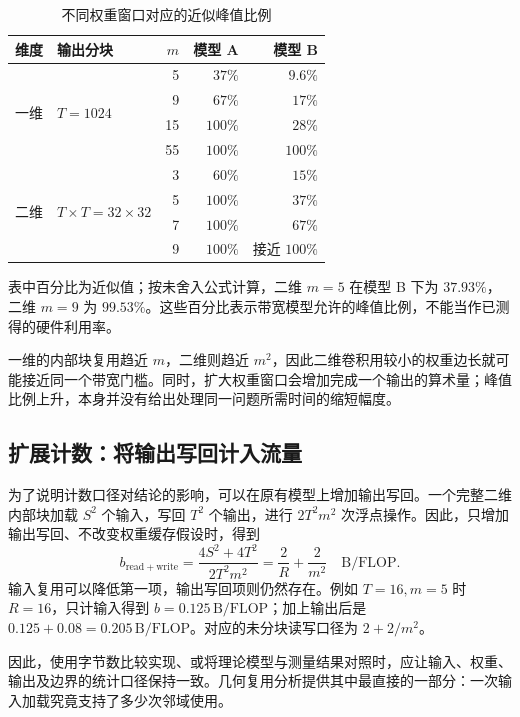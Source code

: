 \begin{table}[htbp]
\centering\small
\caption{不同权重窗口对应的近似峰值比例}
\label{l9:tab:mask-balance}
\begin{tabular}{@{}llrrr@{}}\toprule
维度 & 输出分块 & $m$ & 模型 A & 模型 B\\\midrule
\multirow{4}{*}{一维} & \multirow{4}{*}{$T=1024$} & 5 & $37\%$ & $9.6\%$\\
 & & 9 & $67\%$ & $17\%$\\
 & & 15 & $100\%$ & $28\%$\\
 & & 55 & $100\%$ & $100\%$\\\midrule
\multirow{4}{*}{二维} & \multirow{4}{*}{$T\times T=32\times32$} & 3 & $60\%$ & $15\%$\\
 & & 5 & $100\%$ & $37\%$\\
 & & 7 & $100\%$ & $67\%$\\
 & & 9 & $100\%$ & 接近 $100\%$\\\bottomrule
\end{tabular}
\end{table}

表中百分比为近似值；按未舍入公式计算，二维 $m=5$ 在模型 B 下为 $37.93\%$，二维 $m=9$ 为 $99.53\%$。这些百分比表示带宽模型允许的峰值比例，不能当作已测得的硬件利用率。

一维的内部块复用趋近 $m$，二维则趋近 $m^2$，因此二维卷积用较小的权重边长就可能接近同一个带宽门槛。同时，扩大权重窗口会增加完成一个输出的算术量；峰值比例上升，本身并没有给出处理同一问题所需时间的缩短幅度。

\subsection{扩展计数：将输出写回计入流量}
为了说明计数口径对结论的影响，可以在原有模型上增加输出写回。一个完整二维内部块加载 $S^2$ 个输入，写回 $T^2$ 个输出，进行 $2T^2m^2$ 次浮点操作。因此，只增加输出写回、不改变权重缓存假设时，得到
\begin{equation}
 b_{\mathrm{read+write}}
 =\frac{4S^2+4T^2}{2T^2m^2}
 =\frac{2}{R}+\frac{2}{m^2}\quad\mathrm{B}/\mathrm{FLOP}.
 \label{l9:eq:include-output}
\end{equation}
输入复用可以降低第一项，输出写回项则仍然存在。例如 $T=16,m=5$ 时 $R=16$，只计输入得到 $b=0.125\,\mathrm{B}/\mathrm{FLOP}$；加上输出后是 $0.125+0.08=0.205\,\mathrm{B}/\mathrm{FLOP}$。对应的未分块读写口径为 $2+2/m^2$。

因此，使用字节数比较实现、或将理论模型与测量结果对照时，应让输入、权重、输出及边界的统计口径保持一致。几何复用分析提供其中最直接的一部分：一次输入加载究竟支持了多少次邻域使用。
\FloatBarrier
